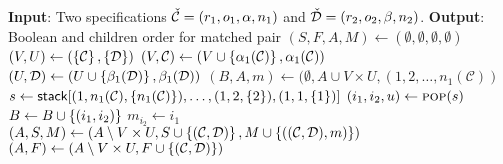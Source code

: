 {
\setphaserulewidth{.7pt}

\begin{algorithmic}[1]
\Statex \textbf{Input}: Two specifications $\check{\mathcal{C}} = (r_1,o_1,\alpha,n_1)$ and $\check{\mathcal{D}} = (r_2,o_2,\beta,n_2)$.
\Statex \textbf{Output}: Boolean and children order for matched pair
\State $(S,F,A,M) \gets (\emptyset,\emptyset,\emptyset,\emptyset)$ 
        \State{}
    \EndIf
        \State{}
    \EndIf
    \State $(V,U) \gets \left(\left\{\mathcal{C}\right\}, \left\{\mathcal{D}\right\}\right)$
        \State $\left(V, \mathcal{C}\right) \gets \left(V \cup \left\{\alpha_1(\mathcal{C})\right\}, \alpha_1(\mathcal{C})\right)$
    \EndWhile
        \State $\left(U, \mathcal{D}\right) \gets \left(U \cup \left\{\beta_1(\mathcal{D})\right\}, \beta_1(\mathcal{D})\right)$
    \EndWhile
        \State {}
    \EndIf
        \State {}
    \EndIf
    \State $(B,A,m) \gets (\emptyset, A \cup V \times U, (1,2,\ldots,n_1(\mathcal{C}))$
    \State $s \gets \textsf{stack}[(1,n_1(\mathcal{C}),\left\{n_1(\mathcal{C})\right\}),\dotsc,(1,2,\left\{2\right\}),(1,1,\left\{1\right\})]$
        \State $(i_1,i_2,u) \gets \Call{pop}{s}$
            \State $B \gets B \cup \left\{(i_1,i_2)\right\}$
            \State \algorithmiccontinue
        \EndIf
        \State $m_{i_2} \gets i_1$
            \State $(A,S,M) \gets \left(A \setminus V \times U, S \cup \left\{(\mathcal{C}, \mathcal{D})\right\}, M \cup \left\{((\mathcal{C}, \mathcal{D}), m)\right\}\right)$
            \State{}
        \EndIf
            \State {}
        \EndFor
    \EndWhile
    \State $(A, F) \gets \left(A \setminus V \times U, F \cup \left\{(\mathcal{C}, \mathcal{D})\right\}\right)$
    \State{}
\EndProcedure
\State{}
\end{algorithmic}

}